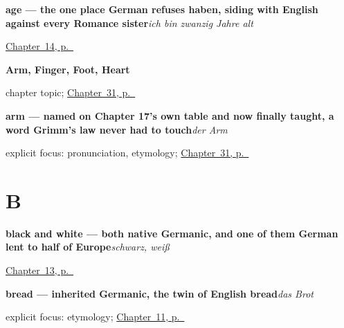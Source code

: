\noindent\begin{minipage}[t]{\linewidth}
\raggedright
\textbf{age — the one place German refuses haben, siding with English against every Romance sister}\enspace\emph{ich bin zwanzig Jahre alt}\par
\footnotesize \hyperref[ch:haben-alter]{Chapter~14, p.~\pageref*{ch:haben-alter}}
\end{minipage}\par\smallskip

\noindent\begin{minipage}[t]{\linewidth}
\raggedright
\textbf{Arm, Finger, Foot, Heart}\par
\footnotesize chapter topic; \hyperref[ch:ge-hand-table-complete]{Chapter~31, p.~\pageref*{ch:ge-hand-table-complete}}
\end{minipage}\par\smallskip

\noindent\begin{minipage}[t]{\linewidth}
\raggedright
\textbf{arm — named on Chapter 17's own table and now finally taught, a word Grimm's law never had to touch}\enspace\emph{der Arm}\par
\footnotesize explicit focus: pronunciation, etymology; \hyperref[ch:ge-hand-table-complete]{Chapter~31, p.~\pageref*{ch:ge-hand-table-complete}}
\end{minipage}\par\smallskip

\section*{B}

\noindent\begin{minipage}[t]{\linewidth}
\raggedright
\textbf{black and white — both native Germanic, and one of them German lent to half of Europe}\enspace\emph{schwarz, weiß}\par
\footnotesize \hyperref[ch:colours]{Chapter~13, p.~\pageref*{ch:colours}}
\end{minipage}\par\smallskip

\noindent\begin{minipage}[t]{\linewidth}
\raggedright
\textbf{bread — inherited Germanic, the twin of English bread}\enspace\emph{das Brot}\par
\footnotesize explicit focus: etymology; \hyperref[ch:food]{Chapter~11, p.~\pageref*{ch:food}}
\end{minipage}\par\smallskip

